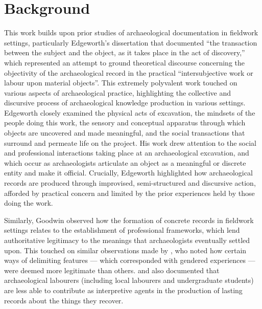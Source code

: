 \documentclass[
]{article}
\author{}
\date{}
\begin{document}
\section{Background}\label{background}

This work builds upon prior studies of archaeological documentation in
fieldwork settings, particularly Edgeworth's
\autocite*[28]{edgeworth1991} dissertation that documented ``the
transaction between the subject and the object, as it takes place in the
act of discovery,'' which represented an attempt to ground theoretical
discourse concerning the objectivity of the archaeological record in the
practical ``intersubjective work or labour upon material objects''. This
extremely polyvalent work touched on various aspects of archaeological
practice, highlighting the collective and discursive process of
archaeological knowledge production in various settings. Edgeworth
closely examined the physical acts of excavation, the mindsets of the
people doing this work, the sensory and conceptual apparatus through
which objects are uncovered and made meaningful, and the social
transactions that surround and permeate life on the project. His work
drew attention to the social and professional interactions taking place
at an archaeological excavation, and which occur as archaeologists
articulate an object as a meaningful or discrete entity and make it
official. Crucially, Edgeworth highlighted how archaeological records
are produced through improvised, semi-structured and discursive action,
afforded by practical concern and limited by the prior experiences held
by those doing the work.

Similarly, Goodwin \autocite*{goodwin1994,goodwin2010} observed how the
formation of concrete records in fieldwork settings relates to the
establishment of professional frameworks, which lend authoritative
legitimacy to the meanings that archaeologists eventually settled upon.
This touched on similar observations made by \textcite{gero1996}, who
noted how certain ways of delimiting features --- which corresponded
with gendered experiences --- were deemed more legitimate than others.
\textcite{mickel2021} and \textcite{yarrow2008} also documented that
archaeological labourers (including local labourers and undergraduate
students) are less able to contribute as interpretive agents in the
production of lasting records about the things they recover.
\end{document}
